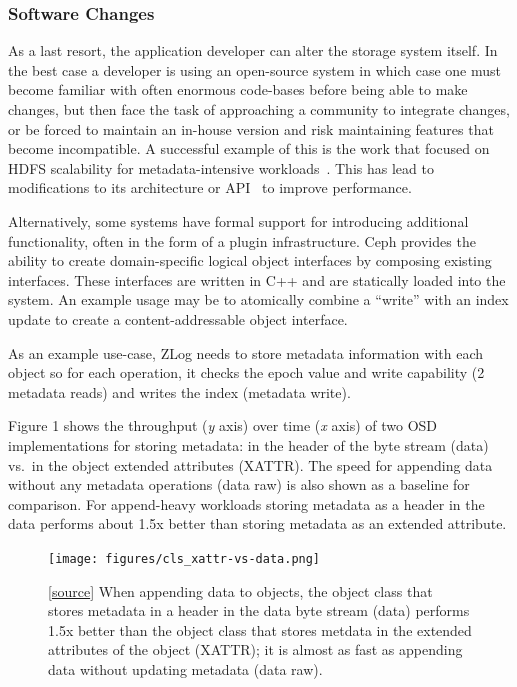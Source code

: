 \documentclass[10pt,twocolumn]{article}
\begin{document}
\subsubsection{Software Changes}\label{software-changes}

As a last resort, the application developer can alter the storage system
itself. In the best case a developer is using an open-source system in which
case one must become familiar with often enormous code-bases before being able
to make changes, but then face the task of approaching a community to
integrate changes, or be forced to maintain an in-house version and risk
maintaining features that become incompatible.  A successful example of this
is the work that focused on HDFS scalability for metadata-intensive workloads~\cite{shvachko_hdfs_2010}. This has lead to modifications to its
architecture or API~\cite{balmin:sigmod2012-clydesdale} to improve
performance.

Alternatively, some systems have formal support for introducing additional
functionality, often in the form of a plugin infrastructure. Ceph provides the
ability to create domain-specific logical object interfaces by composing
existing interfaces. These interfaces are written in C++ and are statically
loaded into the system. An example usage may be to atomically combine a
``write'' with an index update to create a content-addressable object
interface.

As an example use-case, ZLog needs to
store metadata information with each object so for each operation, it
checks the epoch value and write capability (2 metadata reads) and
writes the index (metadata write).
\fi

Figure 1 shows the throughput
(\emph{y} axis) over time (\emph{x} axis) of two OSD implementations for
storing metadata: in the header of the byte stream (data) vs.~in the
object extended attributes (XATTR). The speed for appending data without
any metadata operations (data raw) is also shown as a baseline for
comparison. For append-heavy workloads storing metadata as a header in
the data performs about 1.5x better than storing metadata as an extended
attribute.

\begin{figure}[htbp]
\centering
\texttt{[image: figures/cls\_xattr-vs-data.png]}
\caption{{[}\href{https://github.com/michaelsevilla/malacology-popper/blob/master/experiments/figure1/visualize.ipynb}{source}{]}
When appending data to objects, the object class that stores metadata in
a header in the data byte stream (data) performs 1.5x better than the
object class that stores metdata in the extended attributes of the
object (XATTR); it is almost as fast as appending data without updating
metadata (data raw).}
\end{figure}
\end{document}
